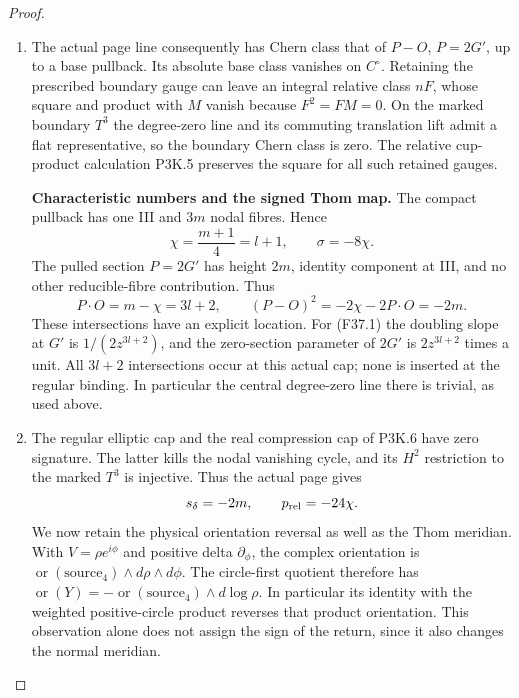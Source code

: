 \begin{proof}
\begin{enumerate}[label=\arabic*.]
\item The actual page line consequently has Chern class that of
$P-O$, $P=2G'$, up to a base pullback. Its absolute base class
vanishes on $C^\circ$. Retaining the prescribed boundary
gauge can leave an integral relative class $nF$, whose square
and product with $M$ vanish because $F^2=FM=0$. On the marked
boundary $T^3$ the degree-zero line and its commuting
translation lift admit a flat representative, so the boundary
Chern class is zero. The relative cup-product calculation
P3K.5 preserves the square for all such retained gauges.

\par\medskip\noindent\textbf{Characteristic numbers and the signed Thom map.}
The compact pullback has one III and $3m$ nodal fibres.
Hence
\[
 \chi=\frac{m+1}{4}=l+1,\qquad \sigma=-8\chi.
\]
The pulled section $P=2G'$ has height $2m$, identity component
at III, and no other reducible-fibre contribution. Thus
\[
 P\cdot O=m-\chi=3l+2,\qquad
 (P-O)^2=-2\chi-2P\cdot O=-2m.                         \tag{K24.9}
\]
These intersections have an explicit location. For (F37.1)
the doubling slope at $G'$ is $1/(2z^{3l+2})$, and the
zero-section parameter of $2G'$ is $2z^{3l+2}$ times a unit.
All $3l+2$ intersections occur at this actual cap; none is
inserted at the regular binding. In particular the central
degree-zero line there is trivial, as used above.

\item The regular elliptic cap and the real compression cap of
P3K.6 have zero signature. The latter kills the nodal vanishing
cycle, and its $H^2$ restriction to the marked $T^3$ is
injective. Thus the actual page gives
\[
                 s_\delta=-2m,\qquad p_{\rm rel}=-24\chi.
\]
We now retain the physical orientation reversal as well as
the Thom meridian. With $V=\rho e^{i\phi}$ and positive
delta $\partial_\phi$, the complex orientation is
$\operatorname{or}(\text{source}_4)\wedge d\rho\wedge d\phi$.
The circle-first quotient therefore has
$\operatorname{or}(Y)=-\operatorname{or}(\text{source}_4)
\wedge d\log\rho$. In particular its identity with the
weighted positive-circle product reverses that product
orientation. This observation alone does not assign the sign
of the return, since it also changes the normal meridian.


\end{enumerate}
\end{proof}
